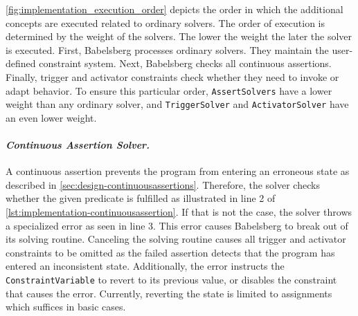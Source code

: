 \autoref{fig:implementation_execution_order} depicts the order in which the additional concepts are executed related to ordinary solvers. The order of execution is determined by the weight of the solvers. The lower the weight the later the solver is executed.
First, Babelsberg processes ordinary solvers. They maintain the user-defined constraint system.
Next, Babelsberg checks all continuous assertions.
Finally, trigger and activator constraints check whether they need to invoke or adapt behavior.
To ensure this particular order, \texttt{AssertSolvers} have a lower weight than any ordinary solver, and \texttt{TriggerSolver} and \texttt{ActivatorSolver} have an even lower weight.


\paragraph{\emph{Continuous Assertion Solver.}}
A continuous assertion prevents the program from entering an erroneous state as described in \autoref{sec:design-continuousassertions}.
Therefore, the solver checks whether the given predicate is fulfilled as illustrated in line 2 of \autoref{lst:implementation-continuousassertion}.
If that is not the case, the solver throws a specialized error as seen in line 3. This error causes Babelsberg to break out of its solving routine.
Canceling the solving routine causes all trigger and activator constraints to be omitted as the failed assertion detects that the program has entered an inconsistent state.
Additionally, the error instructs the \texttt{ConstraintVariable} to revert to its previous value, or disables the constraint that causes the error.
Currently, reverting the state is limited to assignments which suffices in basic cases.

